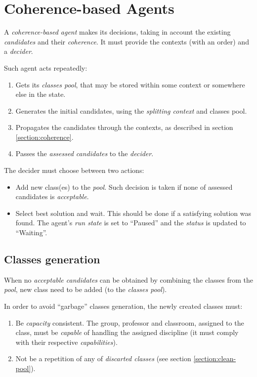 \section{Coherence-based Agents}


A \emph{coherence-based agent} makes its decisions, taking in account
the existing \emph{candidates} and their \emph{coherence}.
It must provide the contexts (with an order) and a \emph{decider}.
\medskip

\noindent
Such agent acts repeatedly:
\begin{enumerate}
\item Gets its \emph{classes pool}, that may be stored within some context or
  somewhere else in the state.
\item Generates the initial candidates, using the \emph{splitting context} and
  classes pool.
\item Propagates the candidates through the contexts, as described in section
  \ref{section:coherence}.
\item Passes the \emph{assessed candidates} to the \emph{decider}.
\end{enumerate}

The decider must choose between two actions:
\begin{itemize}
\item Add new class(es) to the \emph{pool}. Such decision is taken if
  none of assessed candidates is \emph{acceptable}.
\item Select best solution and wait. This should be done if a satisfying
  solution was found. The agent's \emph{run state} is set to ``Paused'' and
  the \emph{status} is updated to ``Waiting''.
\end{itemize}


\subsection{Classes generation}
\label{section:class-gen}
When no \emph{acceptable candidates} can be obtained by combining the classes
from the \emph{pool}, new class need to be added (to the \emph{classes pool}).

In order to avoid ``garbage'' classes generation, the newly created classes must:
\begin{enumerate}[(1)]
  \item Be \emph{capacity} consistent. The group, professor and classroom,
    assigned to the class, must be \emph{capable} of handling the assigned discipline
    (it must comply with their respective \emph{capabilities}).
  \item Not be a repetition of any of \emph{discarted classes}
    (see section \ref{section:clean-pool}).
\end{enumerate}

